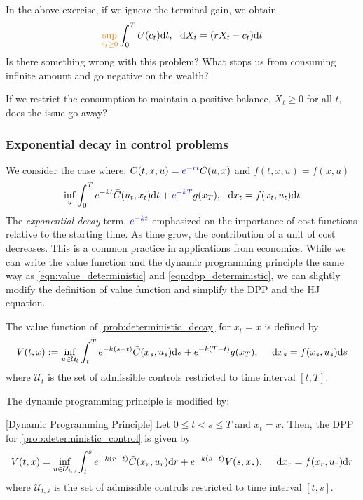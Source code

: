 \documentclass[11pt]{book}
\newcommand{\dd}{\text{\normalfont d}}
\newcommand{\dt}{\text{\normalfont d}t}
\newcommand{\ds}{\text{\normalfont d}s}
\newcommand{\dr}{\text{\normalfont d}r}
\newcommand{\dx}{\text{\normalfont d}x}
\begin{document}
\begin{ex}\label{ex:consumption_no_terminal}
    In the above exercise, if we ignore the terminal gain, we obtain 
    \[
        {\color{orange}\sup_{c_t\ge0}}\int_0^T U(c_t)\dt,~~\dd{X}_t = (rX_t - c_t)\dt
    \]
    Is there something wrong with this problem? What stops us from consuming infinite amount and go negative on the wealth?

    If we restrict the consumption to maintain a positive balance, $X_t\ge0$ for all $t$, does the issue go away?
\end{ex}
\subsubsection{Exponential decay in control problems}
We consider the case where, $C(t,x,u)={\color{blue}e^{-r t}}\bar{C}(u,x)$ and $f(t,x,u)=f(x,u)$
\begin{equation}
\label{prob:deterministic_decay}
    \inf_{u}\int_0^T e^{-k t}\bar{C}(u_t,x_t)\dt + {\color{blue}e^{-k T}}g(x_T),~~\dx_t=f(x_t,u_t)\dt
\end{equation}
The \emph{exponential decay} term, ${\color{blue}e^{-kt}}$ emphasized on the importance of cost functions relative to the starting time. As time grow, the contribution of a unit of cost decreases. This is a common practice in applications from economics. While we can write the value function and the dynamic programming principle the same way as \eqref{eqn:value_deterministic} and \eqref{eqn:dpp_deterministic}, we can slightly modify the definition of value function and simplify the DPP and the HJ equation.
\begin{defn}
The value function of \eqref{prob:deterministic_decay} for $x_t=x$ is defined by
\begin{equation}\label{eqn:value_deterministic_decay}
    V(t,x):= \inf_{u\in\mathcal{U}_{t}}\int_t^Te^{-k(s-t)}\bar{C}(x_s,u_s){{\ds}}+e^{-k(T-t)}g(x_T),~~~~{\dx}_s=f(x_s,u_s){{\ds}}
\end{equation}
where $\mathcal{U}_{t}$ is the set of admissible controls restricted to time interval $[t,T]$.
\end{defn}
The dynamic programming principle is modified by:
\begin{thm}\label{thm:stoch_dpp_no_stopping_deterministic_decay}
    [Dynamic Programming Principle]
    Let $0\le t<s\le T$ and $x_t=x$. Then, the DPP for \eqref{prob:deterministic_control} is given by 
    \begin{equation} \label{eqn:dpp_deterministic_decay}
    V(t,x) =\inf_{u\in\mathcal{U}_{t,s}}\int_t^s e^{-k(r-t)}\bar{C}(x_r,u_r){{\dr}}+e^{-k(s-t)}V(s,x_s),~~~~{\dx}_r=f(x_r,u_r){{\dr}}
\end{equation}
where $\mathcal{U}_{t,s}$ is the set of admissible controls restricted to time interval $[t,s]$.
\end{thm}
\end{document}
